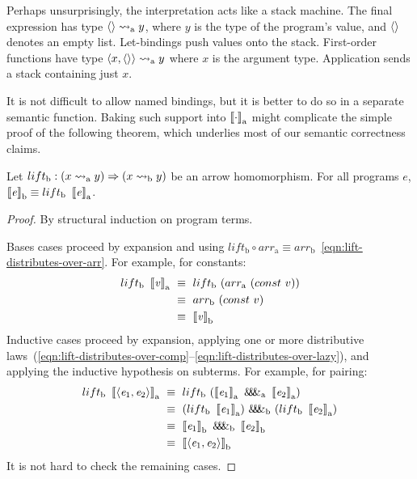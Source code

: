 \documentclass[preprint]{sigplanconf}
\newcommand{\arrow}{\rightsquigarrow}
\newcommand{\arrowlift}{\ensuremath{lift}}
\newcommand{\arrowarr}{\ensuremath{arr}}
\newcommand{\arrowpair}{\ensuremath{\mathit{\&\mspace{-7.5mu}\&\mspace{-7.5mu}\&}}}
\newcommand{\gen}{_\mathrm{a}}
\newcommand{\genb}{_\mathrm{b}}
\begin{document}
Perhaps unsurprisingly, the interpretation acts like a stack machine.
The final expression has type $\pair{} \arrow\gen y$, where $y$ is the type of the program's value, and $\langle{}\rangle$ denotes an empty list.
Let-bindings push values onto the stack.
First-order functions have type $\pair{x,\pair{}} \arrow\gen y$ where $x$ is the argument type.
Application sends a stack containing just $x$.

It is not difficult to allow named bindings, but it is better to do so in a separate semantic function.
Baking such support into $\meaningof{\cdot}\gen$ might complicate the simple proof of the following theorem, which underlies most of our semantic correctness claims.

\begin{theorem}
Let $\arrowlift\genb : (x \arrow\gen y) \tto (x \arrow\genb y)$ be an arrow homomorphism.
For all programs $\mathit{e}$, $\meaningof{\mathit{e}}\genb \equiv \arrowlift\genb~\meaningof{\mathit{e}}\gen$.
\label{thm:homomorphism-implies-correct}
\end{theorem}
\begin{proof}
By structural induction on program terms.

Bases cases proceed by expansion and using $\arrowlift\genb \circ \arrowarr\gen \equiv \arrowarr\genb$~\eqref{eqn:lift-distributes-over-arr}. For example, for constants:
\begin{align*}
	\arrowlift\genb~\meaningof{\mathit{v}}\gen
		&\ \equiv\ \arrowlift\genb~(\arrowarr\gen~(const~v)) \\
		&\ \equiv\ \arrowarr\genb~(const~v) \\
		&\ \equiv\ \meaningof{\mathit{v}}\genb
\end{align*}
Inductive cases proceed by expansion, applying one or more distributive laws~(\ref{eqn:lift-distributes-over-comp}--\ref{eqn:lift-distributes-over-lazy}), and applying the inductive hypothesis on subterms.
For example, for pairing:
\begin{align*}
	\arrowlift\genb~\meaningof{\pair{\mathit{e}_1,\mathit{e}_2}}\gen
		&\ \equiv\ \arrowlift\genb~(\meaningof{\mathit{e}_1}\gen~\arrowpair\gen~\meaningof{\mathit{e}_2}\gen) \\
		&\ \equiv\ (\arrowlift\genb~\meaningof{\mathit{e}_1}\gen)~\arrowpair\genb~(\arrowlift\genb~\meaningof{\mathit{e}_2}\gen) \\
		&\ \equiv\ \meaningof{\mathit{e}_1}\genb~\arrowpair\genb~\meaningof{\mathit{e}_2}\genb \\
		&\ \equiv\ \meaningof{\pair{\mathit{e}_1,\mathit{e}_2}}\genb
\end{align*}
It is not hard to check the remaining cases.
\end{proof}
\end{document}
